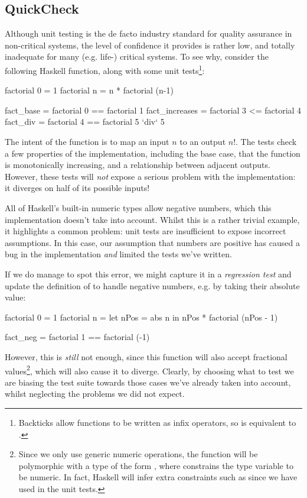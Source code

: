 \subsection{QuickCheck}
\label{sec:quickcheck}

Although unit testing is the de facto industry standard for quality assurance in
non-critical systems, the level of confidence it provides is rather low, and
totally inadequate for many (e.g. life-) critical systems. To see why, consider
the following Haskell function, along with some unit
tests\footnote{Backticks allow functions to be written as infix operators, so
   is equivalent to .}:

\begin{haskell}
factorial 0 = 1
factorial n = n * factorial (n-1)

fact_base      = factorial 0 == factorial 1
fact_increases = factorial 3 <= factorial 4
fact_div       = factorial 4 == factorial 5 `div` 5
\end{haskell}

The intent of the function is to map an input $n$ to an output $n!$. The tests
check a few properties of the implementation, including the base case, that the
function is monotonically increasing, and a relationship between adjacent
outputs. However, these tests will \emph{not} expose a serious problem with the
implementation: it diverges on half of its possible inputs!

All of Haskell's built-in numeric types allow negative numbers, which this
implementation doesn't take into account. Whilst this is a rather trivial
example, it highlights a common problem: unit tests are insufficient to expose
incorrect assumptions. In this case, our assumption that numbers are positive
has caused a bug in the implementation \emph{and} limited the tests we've
written.

If we do manage to spot this error, we might capture it in a \emph{regression
  test} and update the definition of  to handle negative numbers,
e.g. by taking their absolute value:

\begin{haskell}
factorial 0 = 1
factorial n = let nPos = abs n
               in nPos * factorial (nPos - 1)

fact_neg = factorial 1 == factorial (-1)
\end{haskell}

However, this is \emph{still} not enough, since this function will also accept
fractional values\footnote{Since we only use generic numeric operations, the
  function will be polymorphic with a type of the form , where  constrains the type variable  to be
  numeric. In fact, Haskell will infer extra constraints such as  since
  we have used \hs{==} in the unit tests.}, which will also cause it to
diverge. Clearly, by choosing what to test we are biasing the test suite towards
those cases we've already taken into account, whilst neglecting the problems we
did not expect.

